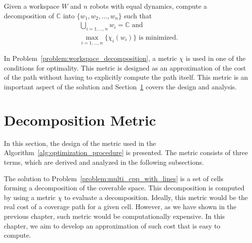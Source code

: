 \documentclass[../main.tex]{subfiles}
\begin{document}
\begin{problem}
\label{problem:workspace_decomposition}
	Given a workspace $W$ and $n$ robots with equal dynamics, compute a decomposition of $\mathbb{C}$ into $\{w_1,w_2,\dots,w_n\}$ such that
	\begin{equation}
	\begin{aligned}
		& \bigcup_{i=1,\dots,n}w_i=\mathbb{C}\text{ and}\\
		& \max_{i=1,\ldots,n}\{\chi_i(w_i)\}\text{ is minimized.}
	\end{aligned}
	\end{equation}
\end{problem}
In Problem~\ref{problem:workspace_decomposition}, a metric $\chi$ is used in one of the conditions for optimality. This metric is designed as an approximation of the cost of the path without having to explicitly compute the path itself. This metric is an important aspect of the solution and Section~\ref{section:decomposition_metric} covers the design and analysis.

\section{Decomposition Metric}
\label{section:decomposition_metric}

In this section, the design of  the metric used in the Algorithm~\ref{alg:optimization_procedure} is presented. The metric consists of three terms, which are derived and analyzed in the following subsections.

The solution to Problem~\ref{problem:multi_cpp_with_lines} is a set of cells forming a decomposition of the coverable space. This decomposition is computed by using a metric $\chi$ to evaluate a decomposition. Ideally, this metric would be the real cost of a coverage path for a given cell. However, as we have shown in the previous chapter, such metric would be computationally expensive. In this chapter, we aim to develop an approximation of such cost that is easy to compute. 
\end{document}
